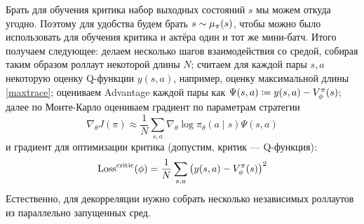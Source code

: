 

Брать для обучения критика набор выходных состояний $s$ мы можем откуда угодно. Поэтому для удобства будем брать $s \HM\sim \mu_\pi(s)$, чтобы можно было использовать для обучения критика и актёра один и тот же мини-батч. Итого получаем следующее: делаем несколько шагов взаимодействия со средой, собирая таким образом роллаут некоторой длины $N$; считаем для каждой пары $s, a$ некоторую оценку Q-функции $y(s, a)$, например, оценку максимальной длины \eqref{maxtrace}; оцениваем Advantage каждой пары как $\Psi(s, a) \HM \coloneqq y(s, a) - V^{\pi}_{\phi}(s)$; далее по Монте-Карло оцениваем градиент по параметрам стратегии
$$\nabla_\theta J(\pi) \approx \frac{1}{N} \sum_{s, a} \nabla_{\theta} \log \pi_\theta (a \mid s) \Psi(s, a)$$
и градиент для оптимизации критика (допустим, критик --- Q-функция):
$$\operatorname{Loss}^{\mathrm{critic}}(\phi) = \frac{1}{N} \sum_{s, a} \left( y(s, a) - V^{\pi}_{\phi}(s) \right)^2$$
Естественно, для декорреляции нужно собрать несколько независимых роллаутов из параллельно запущенных сред.

